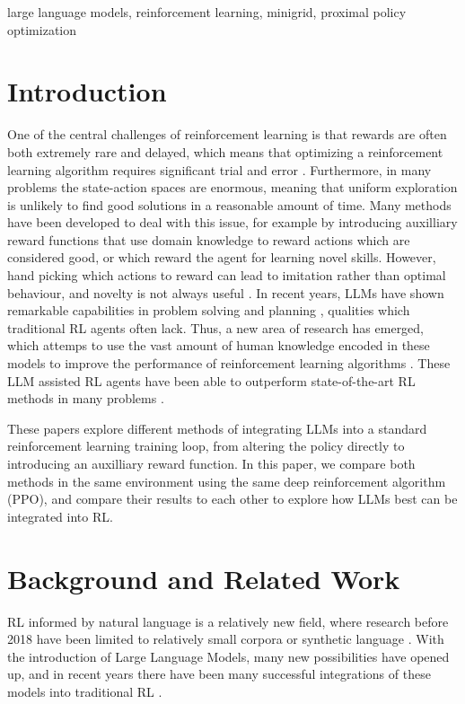 \documentclass[conference]{IEEEtran}
\begin{document}
\begin{IEEEkeywords}
large language models, reinforcement learning, minigrid, proximal policy optimization
\end{IEEEkeywords}

\section{Introduction}

One of the central challenges of reinforcement learning is that rewards are often both extremely rare and delayed, which means that optimizing a reinforcement learning algorithm requires significant trial and error \cite[423]{brunton}. Furthermore, in many problems the state-action spaces are enormous, meaning that uniform exploration is unlikely to find good solutions in a reasonable amount of time. Many methods have been developed to deal with this issue, for example by introducing auxilliary reward functions that use domain knowledge to reward actions which are considered good, or which reward the agent for learning novel skills. However, hand picking which actions to reward can lead to imitation rather than optimal behaviour, and novelty is not always useful \cite[1]{ellm}. In recent years, LLMs have shown remarkable capabilities in problem solving and planning \cite{sparks}, qualities which traditional RL agents often lack. Thus, a new area of research has emerged, which attemps to use the vast amount of human knowledge encoded in these models to improve the performance of reinforcement learning algorithms \cite{survey}. These LLM assisted RL agents have been able to outperform state-of-the-art RL methods in many problems \cite{omni} \cite{ellm} \cite{idm}.

These papers explore different methods of integrating LLMs into a standard reinforcement learning training loop, from altering the policy directly to introducing an auxilliary reward function. In this paper, we compare both methods in the same environment using the same deep reinforcement algorithm (PPO), and compare their results to each other to explore how LLMs best can be integrated into RL.

\section{Background and Related Work}

RL informed by natural language is a relatively new field, where research before 2018 have been limited to relatively small corpora or synthetic language \cite[1]{survey}. With the introduction of Large Language Models, many new possibilities have opened up, and in recent years there have been many successful integrations of these models into traditional RL \cite{omni} \cite{ellm} \cite{idm}.
\end{document}

